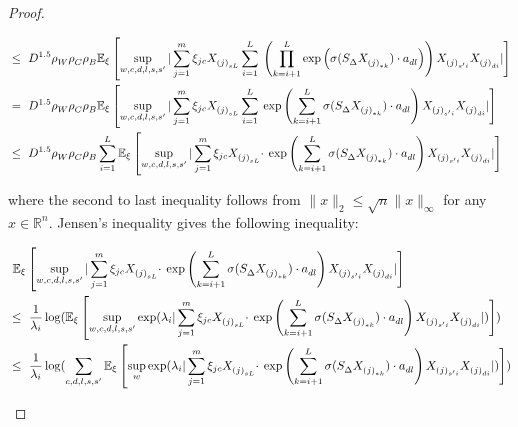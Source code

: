 \begin{proof}
\begin{small}
\begin{equation*}
\begin{aligned}
&\leq~ D^{1.5} \rho^{}_W \rho^{}_C \rho^{}_B \mathbb{E}_{\xi}\left[\sup_{w,c, d, l, s, s'} | \sum_{j=1}^m \xi_{jc}  X^{}_{{(j)}_{sL}} \sum_{i=1}^L \right. \left. \left(\prod_{k=i+1}^L \exp\left(\sigma(S^{}_{\Delta} X^{}_{{(j)}_{*k}}) \cdot a^{}_{dl}\right) \right) X^{}_{{(j)}_{s'i}} X^{}_{{(j)}_{di}} |  \right] \\
&=~ D^{1.5} \rho^{}_W \rho^{}_C \rho^{}_B \mathbb{E}_{\xi}\left[\sup_{w,c, d, l, s, s'} | \sum_{j=1}^m \xi_{jc}  X^{}_{{(j)}_{sL}} \sum_{i=1}^L  \right. \left.\exp\left( \sum_{k=i+1}^L \sigma(S^{}_{\Delta} X^{}_{{(j)}_{*k}}) \cdot a^{}_{dl}\right) X^{}_{{(j)}_{s'i}} X^{}_{{(j)}_{di}} |  \right] \\
&\leq~ D^{1.5} \rho^{}_W \rho^{}_C  \rho^{}_B \sum_{i=1}^L \mathbb{E}_{\xi}\left[\sup_{w,c, d, l, s, s'} | \sum_{j=1}^m \xi_{jc}  X^{}_{{(j)}_{sL}} \cdot  \right. \left. \exp\left( \sum_{k=i+1}^L \sigma(S^{}_{\Delta} X^{}_{{(j)}_{*k}}) \cdot a^{}_{dl}\right) X^{}_{{(j)}_{s'i}} X^{}_{{(j)}_{di}} |  \right]
\end{aligned}
\end{equation*}
\end{small} where the second to last inequality follows from $\|x\|_2 \leq \sqrt{n} \|x\|_{\infty}$ for any $x \in \mathbb{R}^{n}$. 
Jensen's inequality gives the following inequality:
\begin{small}
\begin{equation}\label{eq:eq1}
\begin{aligned}
&~ \E_{\xi}\left[\sup_{w,c, d, l, s, s'} | \sum_{j=1}^m \xi_{jc}  X^{}_{{(j)}_{sL}} \cdot \right. \left. \exp\left( \sum_{k=i+1}^L \sigma(S^{}_{\Delta} X^{}_{{(j)}_{*k}}) \cdot a^{}_{dl}\right) X^{}_{{(j)}_{s'i}} X^{}_{{(j)}_{di}} |  \right] \\
&\leq~  \frac{1}{\lambda_i} \log ( \E_{\xi}\left[\sup_{w,c, d, l, s, s'}  \exp (\lambda_i  | \sum_{j=1}^m \xi_{jc}  X^{}_{{(j)}_{sL}} \cdot \right. \left.  \exp\left( \sum_{k=i+1}^L \sigma(S^{}_{\Delta} X^{}_{{(j)}_{*k}}) \cdot a^{}_{dl}\right) X^{}_{{(j)}_{s'i}} X^{}_{{(j)}_{di}} |)  \right] ) \\
&\leq~  \frac{1}{\lambda_i} \log ( \sum_{c, d, l, s, s'} \E_{\xi}\left[\sup_{w} \exp(\lambda_i  | \sum_{j=1}^m \xi_{jc}  X^{}_{{(j)}_{sL}} \cdot  \right. \left. \exp\left( \sum_{k=i+1}^L \sigma(S^{}_{\Delta} X^{}_{{(j)}_{*k}}) \cdot a^{}_{dl}\right) X^{}_{{(j)}_{s'i}} X^{}_{{(j)}_{di}} |)  \right] ) \\

\end{aligned}
\end{equation}
\end{small}
\end{proof}

